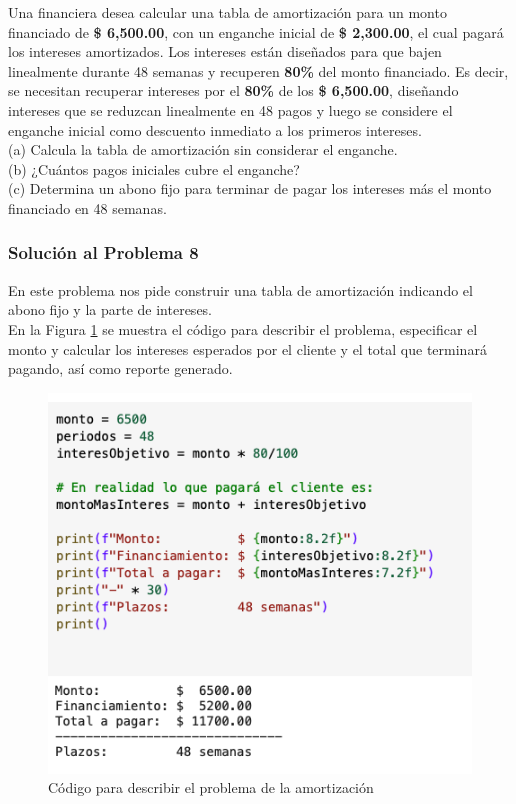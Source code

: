 \documentclass{article}
\begin{document}
Una financiera desea calcular una tabla de amortización para un monto financiado de \textbf{\$ 6,500.00}, con un enganche inicial de \textbf{\$ 2,300.00}, el cual pagará los intereses amortizados. Los intereses están diseñados para que bajen linealmente durante 48 semanas y recuperen \textbf{80\%} del monto financiado. Es decir, se necesitan recuperar intereses por el \textbf{80\%} de los \textbf{\$ 6,500.00}, diseñando intereses que se reduzcan linealmente en 48 pagos y luego se considere el enganche inicial como descuento inmediato a los primeros intereses.
\\[12pt]
(a) Calcula la tabla de amortización sin considerar el enganche.
\\[6pt]
(b) ¿Cuántos pagos iniciales cubre el enganche?
\\[6pt]
(c) Determina un abono fijo para terminar de pagar los intereses más el monto financiado en 48 semanas.

\clearpage

\subsubsection*{Solución al Problema 8}

En este problema nos pide construir una tabla de amortización indicando el abono fijo y la parte de intereses.
\\[12pt]
En la Figura \ref{fig:s108-1} se muestra el código para describir el problema, especificar el monto y calcular los intereses esperados por el cliente y el total que terminará pagando, así como reporte generado.
\begin{figure}[!ht]
    \centering
    \begin{minipage}{\textwidth}
        \centering
        \includegraphics[width=\textwidth]{figures/s108-1.png}
    \end{minipage}
    \captionsetup{width=\textwidth}
    \caption{Código para describir el problema de la amortización}
    \label{fig:s108-1}
\end{figure}
\end{document}
